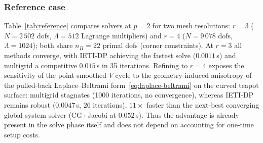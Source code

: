 \documentclass{article}
\newcommand{\nprim}{n_\Pi}                        %
\theoremstyle{plain}
\numberwithin{equation}{section}
\begin{document}
\subsubsection{Reference case} \label{subsubsec:bench-3d-reference}

Table~\ref{tab:reference} compares solvers at $p = 2$ for two mesh resolutions:
$r = 3$ ($N = 2\,502$ dofs, $\Lambda = 512$ Lagrange multipliers) and
$r = 4$ ($N = 9\,078$ dofs, $\Lambda = 1024$); both share $\nprim = 22$ primal
dofs (corner constraints).
At $r = 3$ all methods converge, with IETI-DP achieving the fastest solve
($0.0011\,$s) and multigrid a competitive $0.015\,$s in 35 iterations.
Refining to $r = 4$ exposes the sensitivity of the point-smoothed $V$-cycle to
the geometry-induced anisotropy of the pulled-back Laplace--Beltrami
form~\eqref{eq:laplace-beltrami} on the curved teapot surface: multigrid
stagnates (1000 iterations, no convergence), whereas IETI-DP remains robust
($0.0047\,$s, 26 iterations), $11\times$ faster than the next-best converging
global-system solver (CG+Jacobi at $0.052\,$s).
Thus the advantage is already present in the solve phase itself and does not
depend on accounting for one-time setup costs.
\end{document}
